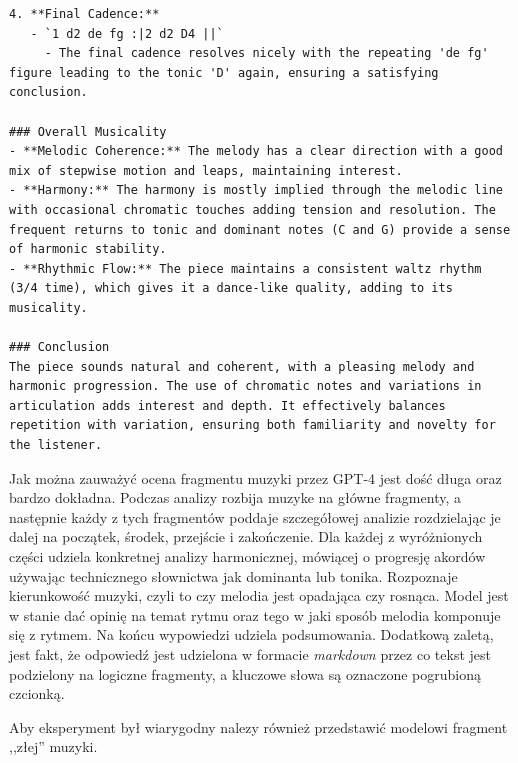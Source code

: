 \documentclass[data-science]{agh-wi} %
\begin{document}
\begin{verbatim}
4. **Final Cadence:**
   - `1 d2 de fg :|2 d2 D4 ||`
     - The final cadence resolves nicely with the repeating 'de fg' figure leading to the tonic 'D' again, ensuring a satisfying conclusion.

### Overall Musicality
- **Melodic Coherence:** The melody has a clear direction with a good mix of stepwise motion and leaps, maintaining interest.
- **Harmony:** The harmony is mostly implied through the melodic line with occasional chromatic touches adding tension and resolution. The frequent returns to tonic and dominant notes (C and G) provide a sense of harmonic stability.
- **Rhythmic Flow:** The piece maintains a consistent waltz rhythm (3/4 time), which gives it a dance-like quality, adding to its musicality.

### Conclusion
The piece sounds natural and coherent, with a pleasing melody and harmonic progression. The use of chromatic notes and variations in articulation adds interest and depth. It effectively balances repetition with variation, ensuring both familiarity and novelty for the listener.
\end{verbatim}

Jak można zauważyć ocena fragmentu muzyki przez GPT-4 jest dość długa oraz bardzo dokładna. Podczas analizy rozbija muzyke na główne fragmenty, a następnie każdy z tych fragmentów poddaje szczegółowej analizie rozdzielając je dalej na początek, środek, przejście i zakończenie. Dla każdej z wyróżnionych części udziela konkretnej analizy harmonicznej, mówiącej o progresję akordów używając technicznego słownictwa jak dominanta lub tonika. Rozpoznaje kierunkowość muzyki, czyli to czy melodia jest opadająca czy rosnąca. Model jest w stanie dać opinię na temat rytmu oraz tego w jaki sposób melodia komponuje się z rytmem. Na końcu wypowiedzi udziela podsumowania. Dodatkową zaletą, jest fakt, że odpowiedź jest udzielona w formacie \textit{markdown} przez co tekst jest podzielony na logiczne fragmenty, a kluczowe słowa są oznaczone pogrubioną czcionką.

Aby eksperyment był wiarygodny nalezy również przedstawić modelowi fragment ,,złej'' muzyki.
\end{document}
